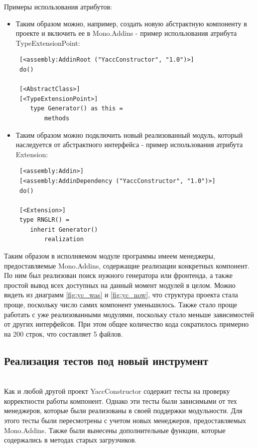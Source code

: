 \documentclass{matmex-diploma}
\begin{document}
\begin{enumerate}
Примеры использования атрибутов:
\begin{itemize}
\item  Таким образом можно, например, создать новую абстрактную компоненту в проекте и включить ее в Mono.Addins - пример использования атрибута TypeExtensionPoint:
\begin{verbatim}
 [<assembly:AddinRoot ("YaccConstructor", "1.0")>]
 do()
 
 [<AbstractClass>]
 [<TypeExtensionPoint>]
    type Generator() as this = 
        methods
\end{verbatim}


\item Таким образом можно подключить новый реализованный модуль, который наследуется от абстрактного интерфейса - пример использования атрибута Extension: 

\begin{verbatim}
 [<assembly:Addin>]
 [<assembly:AddinDependency ("YaccConstructor", "1.0")>]
 do()
 
 [<Extension>]
 type RNGLR() =
    inherit Generator()
        realization
\end{verbatim}
\end{itemize}

Таким образом в исполняемом модуле программы имеем менеджеры, предоставляемые Mono.Addins, содержащие реализации конкретных компонент. По ним был реализован поиск нужного генератора или фронтенда, а также простой вывод всех доступных на данный момент модулей в целом. Можно видеть из диаграмм \ref{fig:yc_was} и \ref{fig:yc_now}, что структура проекта стала проще, поскольку число самих компонент уменьшилось. Также стало проще работать с уже реализованными  модулями, поскольку стало меньше зависимостей от других интерфейсов.
При этом общее количество кода сократилось примерно на 200 строк, что составляет 5 файлов.


\newpage
\subsection {Реализация тестов под новый инструмент}\\
Как и любой другой проект YaccConstructor содержит тесты на проверку корректности работы компонент.
Однако эти тесты были зависимыми от тех менеджеров, которые были реализованы в своей поддержки модульности. Для этого тесты были пересмотрены с учетом новых менеджеров, предоставляемых Mono.Addins. Также были вынесены дополнительные функции, которые содержались в методах старых загрузчиков.



\end{enumerate}
\end{document}
